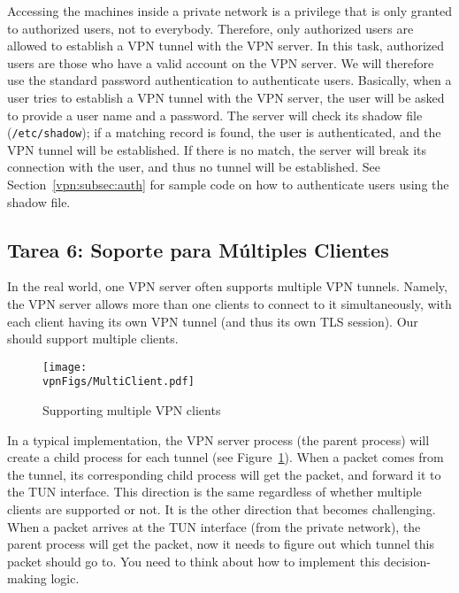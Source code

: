 Accessing the machines inside a private network is a privilege that is only
granted to authorized users, not to everybody. Therefore, only authorized
users are allowed to establish a VPN tunnel with the VPN server. 
In this task, authorized users are those who have a valid account on the VPN server.
We will therefore use the standard password authentication to authenticate
users. Basically, when a user tries to establish a VPN tunnel 
with the VPN server, the user will be asked to provide a user name and a
password. The server will check its shadow file (\texttt{/etc/shadow}); 
if a matching record is found, the user is authenticated, and the 
VPN tunnel will be established. If there is no match, the server will
break its connection with the user, and thus no tunnel will be established. 
See Section~\ref{vpn:subsec:auth} for 
sample code on how to authenticate users using the shadow file.


\subsection{Tarea 6: Soporte para Múltiples Clientes}


In the real world, one VPN server often supports multiple VPN tunnels. 
Namely, the VPN server allows more than one clients to 
connect to it simultaneously, with each client having its own VPN tunnel (and thus
its own TLS session). Our \miniVPN should support 
multiple clients. 


\begin{figure}[htb]
\begin{center}
\texttt{[image: \\vpnFigs/MultiClient.pdf]}
\end{center}
\caption{Supporting multiple VPN clients}
\label{vpn:fig:MultiClient}
\end{figure}
 

In a typical implementation, the VPN server process (the parent
process) will create a child process for each tunnel (see  
Figure~\ref{vpn:fig:MultiClient}).
When a packet comes from the tunnel, its corresponding child process 
will get the packet, and forward it to the TUN interface. 
This direction is the same regardless of whether multiple clients are 
supported or not. It is the other direction that becomes challenging. 
When a packet arrives at the TUN interface (from the private network), 
the parent process will get the packet, now it needs to figure out which
tunnel this packet should go to. You need to think about how to implement
this decision-making logic. 


